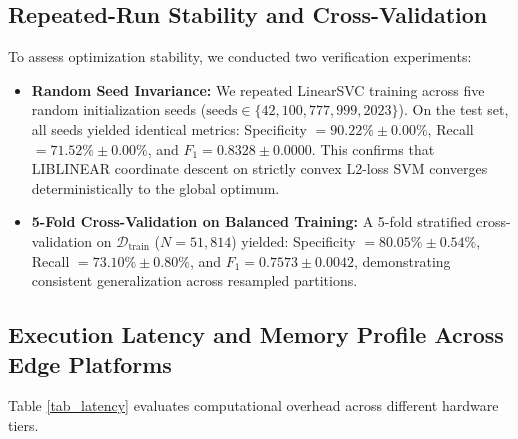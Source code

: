 \documentclass[conference]{IEEEtran}
\begin{document}
\subsection{Repeated-Run Stability and Cross-Validation}
To assess optimization stability, we conducted two verification experiments:
\begin{itemize}
    \item \textbf{Random Seed Invariance:} We repeated LinearSVC training across five random initialization seeds ($\text{seeds} \in \{42, 100, 777, 999, 2023\}$). On the test set, all seeds yielded identical metrics: Specificity $= 90.22\% \pm 0.00\%$, Recall $= 71.52\% \pm 0.00\%$, and $F_1 = 0.8328 \pm 0.0000$. This confirms that LIBLINEAR coordinate descent on strictly convex L2-loss SVM converges deterministically to the global optimum.
    \item \textbf{5-Fold Cross-Validation on Balanced Training:} A 5-fold stratified cross-validation on $\mathcal{D}_{\text{train}}$ ($N=51,814$) yielded: Specificity $= 80.05\% \pm 0.54\%$, Recall $= 73.10\% \pm 0.80\%$, and $F_1 = 0.7573 \pm 0.0042$, demonstrating consistent generalization across resampled partitions.
\end{itemize}

\subsection{Execution Latency and Memory Profile Across Edge Platforms}
Table \ref{tab_latency} evaluates computational overhead across different hardware tiers.

\begin{table}[htbp]
\caption{Inference Latency and Memory Profile Across Hardware Platforms}
\label{tab_latency}
\begin{center}
\end{center}
\end{table}
\end{document}
